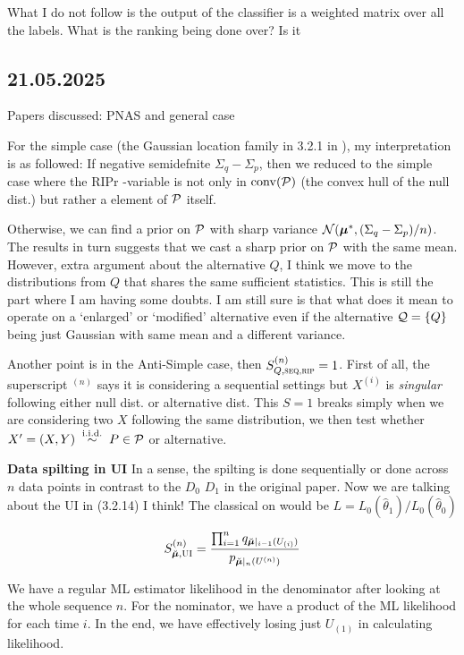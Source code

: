 What I do not follow is the output of the classifier is a weighted matrix over all the labels.
What is the ranking being done over? Is it

\subsection*{21.05.2025}

Papers discussed: PNAS and general case

For the simple case (the Gaussian location family in 3.2.1 in \cite{haoEvaluesAnytimevalidInference2025}),
my interpretation is as followed:
If negative semidefnite $\Sigma_q-\Sigma_p$, then we reduced to the simple case where the RIPr \E-variable is not only
in $\mathrm{conv}(\mathcal{P})$ (the convex hull of the null dist.) but rather a element of $\mathcal{P}$ itself.

Otherwise, we can find a prior on $\mathcal{P}$ with sharp variance $\mathcal{N}(\bm{\mu}^*, (\Sigma_q-\Sigma_p)/n)$.
The results in turn suggests that we cast a sharp prior on $\mathcal{P}$ with the same mean.
However, extra argument about the alternative $Q$, I think we move to the distributions from $Q$
that shares the same sufficient statistics.
This is still the part where I am having some doubts.
I am still sure is that what does it mean to operate on a `enlarged' or `modified'
alternative even if the alternative $\mathcal{Q}=\{Q\}$ being just Gaussian with same mean and a different variance.

Another point is in the Anti-Simple case, then $S_{Q,\textsc{seq,rip}}^{(n)} =1$.
First of all, the superscript $^{(n)}$ says it is considering a sequential settings
but $X^{(i)}$ is \emph{singular} following either null dist. or alternative dist.
This $S=1$ breaks simply when we are considering two $X$ following the same distribution,
we then test whether $X' = (X, Y) \; \overset{\mathrm{i.i.d.}}{\sim} \; P \in \mathcal{P}$ or alternative.

\textbf{Data spilting in UI} \quad In a sense, the spilting is done sequentially or done across $n$
data points in contrast to the $D_0$ $D_1$ in the original paper. Now we are talking about the UI in (3.2.14)
I think! The classical on would be $L = L_0(\hat{\theta}_1)/L_0(\hat{\theta}_0)$

\begin{align*}
	S_{\breve{\bm{\mu}},\textsc{UI}}^{(n)} =
	\frac{\prod_{i=1}^n q_{\breve{\bm{\mu}}|_{i-1}(U_{(i)})}}
	{p_{\breve{\bm{\mu}}|_n(U^{(n)})}}
\end{align*}

We have a regular ML estimator likelihood in the denominator after looking at the whole sequence $n$.
For the nominator, we have a product of the ML likelihood for each time $i$.
In the end, we have effectively losing just $U_{(1)}$ in calculating likelihood.

